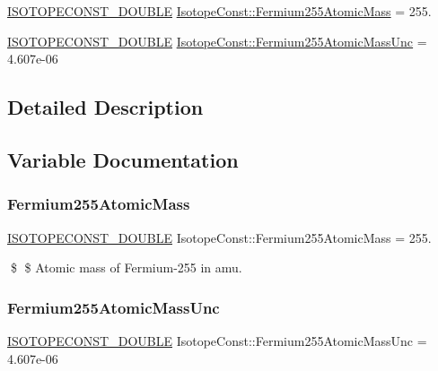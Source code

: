 \begin{DoxyCompactItemize}
\item 
\mbox{\hyperlink{group___isotope_const-_macros_ga8f45a7272ce02c0b4c65c44636ed719a}{I\+S\+O\+T\+O\+P\+E\+C\+O\+N\+S\+T\+\_\+\+D\+O\+U\+B\+LE}} \mbox{\hyperlink{group___isotope_const-_fermium-_fm255_ga8ccd9cfb8613c11ccf1e9636f7e8df92}{Isotope\+Const\+::\+Fermium255\+Atomic\+Mass}} = 255.
\item 
\mbox{\hyperlink{group___isotope_const-_macros_ga8f45a7272ce02c0b4c65c44636ed719a}{I\+S\+O\+T\+O\+P\+E\+C\+O\+N\+S\+T\+\_\+\+D\+O\+U\+B\+LE}} \mbox{\hyperlink{group___isotope_const-_fermium-_fm255_ga1192b804e236e62c5de0596f85d96516}{Isotope\+Const\+::\+Fermium255\+Atomic\+Mass\+Unc}} = 4.\+607e-\/06
\end{DoxyCompactItemize}


\subsection{Detailed Description}


\subsection{Variable Documentation}
\mbox{\label{group___isotope_const-_fermium-_fm255_ga8ccd9cfb8613c11ccf1e9636f7e8df92}} 
\subsubsection{\texorpdfstring{Fermium255\+Atomic\+Mass}{Fermium255AtomicMass}}
{\footnotesize\ttfamily \mbox{\hyperlink{group___isotope_const-_macros_ga8f45a7272ce02c0b4c65c44636ed719a}{I\+S\+O\+T\+O\+P\+E\+C\+O\+N\+S\+T\+\_\+\+D\+O\+U\+B\+LE}} Isotope\+Const\+::\+Fermium255\+Atomic\+Mass = 255.}

\$ \$ Atomic mass of Fermium-\/255 in amu. \mbox{\label{group___isotope_const-_fermium-_fm255_ga1192b804e236e62c5de0596f85d96516}} 
\subsubsection{\texorpdfstring{Fermium255\+Atomic\+Mass\+Unc}{Fermium255AtomicMassUnc}}
{\footnotesize\ttfamily \mbox{\hyperlink{group___isotope_const-_macros_ga8f45a7272ce02c0b4c65c44636ed719a}{I\+S\+O\+T\+O\+P\+E\+C\+O\+N\+S\+T\+\_\+\+D\+O\+U\+B\+LE}} Isotope\+Const\+::\+Fermium255\+Atomic\+Mass\+Unc = 4.\+607e-\/06}

